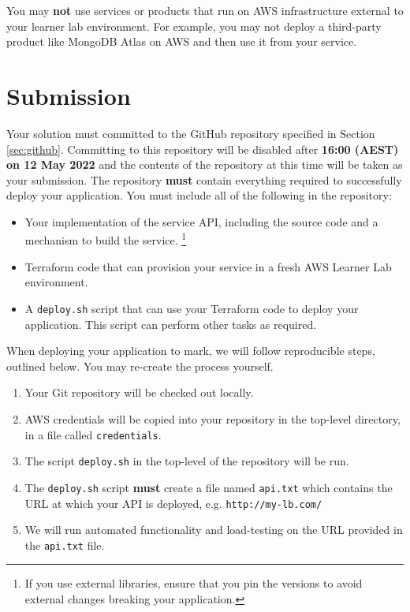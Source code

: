 \documentclass{csse4400}
\begin{document}
You may \textbf{not} use services or products that run on AWS infrastructure external to your learner lab environment.
For example, you may not deploy a third-party product like MongoDB Atlas on AWS and then use it from your service.

\section{Submission}
Your solution must committed to the GitHub repository specified in Section \ref{sec:github}.
Committing to this repository will be disabled after \textbf{16:00 (AEST) on 12 May 2022} and the contents of the repository at this time will be taken as your submission.
The repository \textbf{must} contain everything required to successfully deploy your application.
You must include all of the following in the repository:
\begin{itemize}
  \item Your implementation of the service API, including the source code and a mechanism to build the service.%
  \footnote{If you use external libraries, ensure that you pin the versions to avoid external changes breaking your application.}
  \item Terraform code that can provision your service in a fresh AWS Learner Lab environment.
  \item A \texttt{deploy.sh} script that can use your Terraform code to deploy your application.
    This script can perform other tasks as required.
\end{itemize}

When deploying your application to mark,
we will follow reproducible steps, outlined below.
You may re-create the process yourself.

\begin{enumerate}
  \item Your Git repository will be checked out locally.
  \item AWS credentials will be copied into your repository in the top-level directory,
  in a file called \texttt{credentials}.
  \item The script \texttt{deploy.sh} in the top-level of the repository will be run.
  \item The \texttt{deploy.sh} script \textbf{must} create a file named \texttt{api.txt} which contains the URL at which your API is deployed, e.g. \texttt{http://my-lb.com/}
  \item We will run automated functionality and load-testing on the URL provided in the \texttt{api.txt} file.
\end{enumerate}
\end{document}
